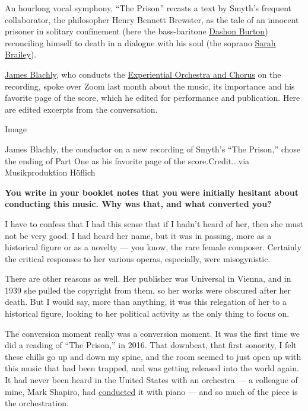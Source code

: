 An hourlong vocal symphony, ``The Prison'' recasts a text by Smyth's
frequent collaborator, the philosopher Henry Bennett Brewster, as the
tale of an innocent prisoner in solitary confinement (here the
bass-baritone \href{http://www.dashonburton.com/}{Dashon Burton})
reconciling himself to death in a dialogue with his soul (the soprano
\href{https://sarahbrailey.com/}{Sarah Brailey}).

\href{http://www.jamesblachly.com/}{James Blachly}, who conducts the
\href{https://experientialorchestra.com/}{Experiential Orchestra and
Chorus} on the recording, spoke over Zoom last month about the music,
its importance and his favorite page of the score, which he edited for
performance and publication. Here are edited excerpts from the
conversation.

Image

James Blachly, the conductor on a new recording of Smyth's ``The
Prison,'' chose the ending of Part One as his favorite page of the
score.Credit...via Musikproduktion Höflich

\textbf{You write in your booklet notes that you were initially hesitant
about conducting this music. Why was that, and what converted you?}

I have to confess that I had this sense that if I hadn't heard of her,
then she must not be very good. I had heard her name, but it was in
passing, more as a historical figure or as a novelty --- you know, the
rare female composer. Certainly the critical responses to her various
operas, especially, were misogynistic.

There are other reasons as well. Her publisher was Universal in Vienna,
and in 1939 she pulled the copyright from them, so her works were
obscured after her death. But I would say, more than anything, it was
this relegation of her to a historical figure, looking to her political
activity as the only thing to focus on.

The conversion moment really was a conversion moment. It was the first
time we did a reading of ``The Prison,'' in 2016. That downbeat, that
first sonority, I felt these chills go up and down my spine, and the
room seemed to just open up with this music that had been trapped, and
was getting released into the world again. It had never been heard in
the United States with an orchestra --- a colleague of mine, Mark
Shapiro, had
\href{https://ceciliachorusny.org/updates-contact/2018/4/13/conductors-note-the-prison-by-dame-ethel-smyth-and-requiem-by-wa-mozart}{conducted}
it with piano --- and so much of the piece is the orchestration.

